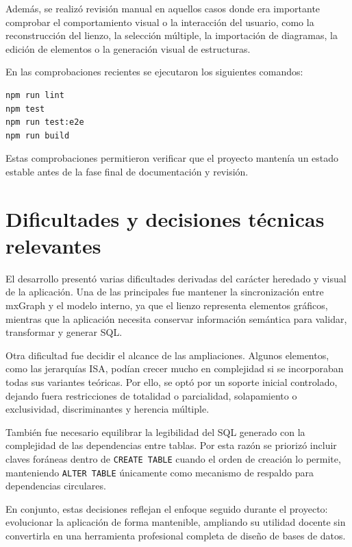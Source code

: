 Además, se realizó revisión manual en aquellos casos donde era importante comprobar el comportamiento visual o la interacción del usuario, como la reconstrucción del lienzo, la selección múltiple, la importación de diagramas, la edición de elementos o la generación visual de estructuras.

En las comprobaciones recientes se ejecutaron los siguientes comandos:

\begin{verbatim}
npm run lint
npm test
npm run test:e2e
npm run build
\end{verbatim}

Estas comprobaciones permitieron verificar que el proyecto mantenía un estado estable antes de la fase final de documentación y revisión.

\section{Dificultades y decisiones técnicas relevantes}

El desarrollo presentó varias dificultades derivadas del carácter heredado y visual de la aplicación. Una de las principales fue mantener la sincronización entre mxGraph y el modelo interno, ya que el lienzo representa elementos gráficos, mientras que la aplicación necesita conservar información semántica para validar, transformar y generar SQL.

Otra dificultad fue decidir el alcance de las ampliaciones. Algunos elementos, como las jerarquías ISA, podían crecer mucho en complejidad si se incorporaban todas sus variantes teóricas. Por ello, se optó por un soporte inicial controlado, dejando fuera restricciones de totalidad o parcialidad, solapamiento o exclusividad, discriminantes y herencia múltiple.

También fue necesario equilibrar la legibilidad del SQL generado con la complejidad de las dependencias entre tablas. Por esta razón se priorizó incluir claves foráneas dentro de \texttt{CREATE TABLE} cuando el orden de creación lo permite, manteniendo \texttt{ALTER TABLE} únicamente como mecanismo de respaldo para dependencias circulares.

En conjunto, estas decisiones reflejan el enfoque seguido durante el proyecto: evolucionar la aplicación de forma mantenible, ampliando su utilidad docente sin convertirla en una herramienta profesional completa de diseño de bases de datos.